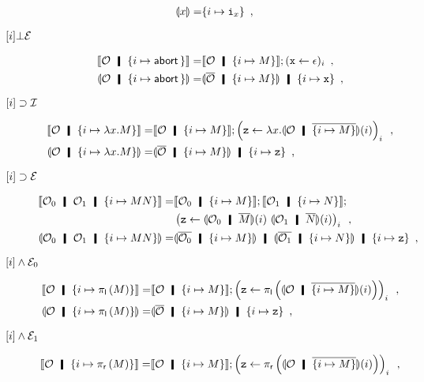 \begin{description}
\begin{align*}
       \llparenthesis{x}\rrparenthesis=& \{i\mapsto \texttt{i}_x\}\enspace,
      \end{align*}
 \item[${\lbrack {i}\rbrack}\bot\mathcal E$]
      \begin{align*}
       \semo{\hypert\hmid\{i\mapsto\abort\}}
       =&\semo{\hypert\hmid\{i\mapsto M\}} ; (\p x\leftarrow \epsilon)_i\enspace,\\
       \semoi{\hypert\hmid\{i\mapsto\abort\}}
       =&\semoi{\overline{\hypert}\hmid\{i\mapsto M\}} \hmid \{i\mapsto
       \p x\}\enspace,
      \end{align*}
 \item[$\lbrack {i}\rbrack\supset\mathcal I$]
\begin{align*}
 \semo{\hypert\hmid \{i\mapsto \lambda x.M\}}=
 & \semo{\hypert\hmid \imapsto{M}}; \left(\p z\leftarrow
 \lambda x. \semoi{\hypert\hmid\overline{\imapsto{M}}}(i)\right)_i \enspace,\\
 \semoi{\hypert\hmid \imapsto{\lambda x.M}} =& \semoi{\overline\hypert\hmid
 \imapsto{M}} \hmid \{i\mapsto \p z\}\enspace,
\end{align*}
 \item[$\lbrack {i}\rbrack\supset\mathcal E$]
\begin{align*}
 \semo{\hypert_0\hmid\hypert_1\hmid \imapsto{MN}}=&
 \semo{\hypert_0\hmid \imapsto{M}};
 \semo{\hypert_1\hmid \imapsto{N}};\\&
 \left(\p z\leftarrow \semoi{\hypert_0\hmid \overline{
 M}}(i)\,\,\semoi{\hypert_1\hmid \overline N}(i)\right)_i\enspace,\\
 \semoi{\hypert_0\hmid\hypert_1\hmid \imapsto{MN}} =&
 \semoi{\overline{\hypert_0}\hmid \imapsto{M}} \hmid
 \semoi{\overline{\hypert_1}\hmid \imapsto{N}}
 \hmid \{i\mapsto \p z\}\enspace,
\end{align*}
 \item[$\lbrack {i}\rbrack\wedge\mathcal E_0$]
\begin{align*}
 \semo{\hypert\hmid \imapsto{\lpil M}} =& \semo{\hypert\hmid \imapsto{M}};
 \left(\p z \leftarrow
 \lpil {\semoi{\hypert\hmid\overline{\imapsto{M}}}(i)}\right)_i\enspace, \\
 \semoi{\hypert\hmid \imapsto{\lpil M}}=& \semoi{\overline \hypert\hmid
 \imapsto{M}}\hmid \{{i\mapsto \p z}\}\enspace,
\end{align*}
 \item[$\lbrack {i}\rbrack\wedge\mathcal E_1$]
\begin{align*}
 \semo{\hypert\hmid \imapsto{\lpir M}} =& \semo{\hypert\hmid \imapsto{M}};
 \left(\p z \leftarrow
 \lpir{ \semoi{\hypert\hmid\overline{\imapsto{M}}}(i) }\right)_i\enspace, \\

\end{align*}
\end{description}
